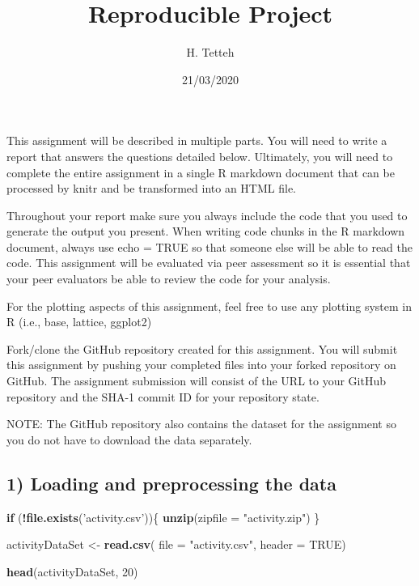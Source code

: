 \documentclass[
]{article}
\title{Reproducible Project}
\author{H. Tetteh}
\date{21/03/2020}
\newenvironment{Shaded}{\begin{snugshade}}{\end{snugshade}}
\newcommand{\ControlFlowTok}[1]{\textcolor[rgb]{0.13,0.29,0.53}{\textbf{#1}}}
\newcommand{\DataTypeTok}[1]{\textcolor[rgb]{0.13,0.29,0.53}{#1}}
\newcommand{\DecValTok}[1]{\textcolor[rgb]{0.00,0.00,0.81}{#1}}
\newcommand{\KeywordTok}[1]{\textcolor[rgb]{0.13,0.29,0.53}{\textbf{#1}}}
\newcommand{\NormalTok}[1]{#1}
\newcommand{\OperatorTok}[1]{\textcolor[rgb]{0.81,0.36,0.00}{\textbf{#1}}}
\newcommand{\OtherTok}[1]{\textcolor[rgb]{0.56,0.35,0.01}{#1}}
\newcommand{\StringTok}[1]{\textcolor[rgb]{0.31,0.60,0.02}{#1}}
\begin{document}
\maketitle

This assignment will be described in multiple parts. You will need to
write a report that answers the questions detailed below. Ultimately,
you will need to complete the entire assignment in a single R markdown
document that can be processed by knitr and be transformed into an HTML
file.

Throughout your report make sure you always include the code that you
used to generate the output you present. When writing code chunks in the
R markdown document, always use echo = TRUE so that someone else will be
able to read the code. This assignment will be evaluated via peer
assessment so it is essential that your peer evaluators be able to
review the code for your analysis.

For the plotting aspects of this assignment, feel free to use any
plotting system in R (i.e., base, lattice, ggplot2)

Fork/clone the GitHub repository created for this assignment. You will
submit this assignment by pushing your completed files into your forked
repository on GitHub. The assignment submission will consist of the URL
to your GitHub repository and the SHA-1 commit ID for your repository
state.

NOTE: The GitHub repository also contains the dataset for the assignment
so you do not have to download the data separately.

\hypertarget{loading-and-preprocessing-the-data}{%
\subsection{1) Loading and preprocessing the
data}\label{loading-and-preprocessing-the-data}}

\begin{Shaded}
\begin{Highlighting}[]
\ControlFlowTok{if}\NormalTok{ (}\OperatorTok{!}\KeywordTok{file.exists}\NormalTok{(}\StringTok{'activity.csv'}\NormalTok{))\{}
  \KeywordTok{unzip}\NormalTok{(}\DataTypeTok{zipfile =} \StringTok{"activity.zip"}\NormalTok{)}
\NormalTok{\}}

\NormalTok{activityDataSet <-}\StringTok{ }\KeywordTok{read.csv}\NormalTok{( }\DataTypeTok{file =} \StringTok{"activity.csv"}\NormalTok{, }\DataTypeTok{header =} \OtherTok{TRUE}\NormalTok{)}
 
 \KeywordTok{head}\NormalTok{(activityDataSet, }\DecValTok{20}\NormalTok{)}
\end{Highlighting}
\end{Shaded}
\end{document}
